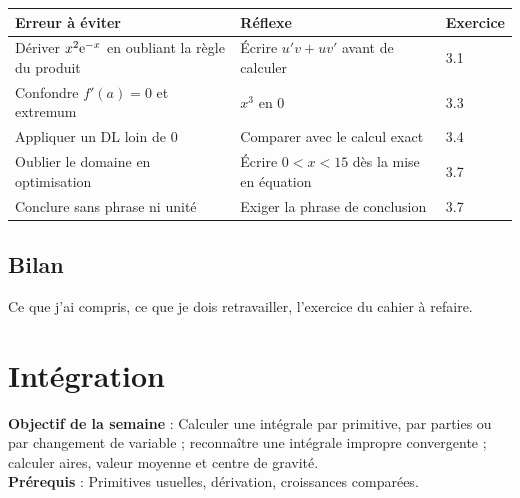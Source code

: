\documentclass[10.5pt,a4paper]{article}
\newif\ifprof
\newcommand{\synth}{\textsf{\textcolor{ardoise}{(synthèse)}}}
\newcommand{\profonly}[1]{\ifprof #1\fi}
\newcommand{\titrecourant}{Guide de séquence}
\begin{document}
\else
\begin{longtable}{@{}p{7.2cm}p{7.2cm}p{1.6cm}@{}}
\toprule \textbf{Erreur à éviter} & \textbf{Réflexe} & \textbf{Exercice}\\ \midrule\endhead
Dériver $x^2\mathrm{e}^{-x}$ en oubliant la règle du produit & Écrire $u'v+uv'$ avant de calculer & 3.1\\
Confondre $f'(a)=0$ et extremum & $x^3$ en $0$ & 3.3\\
Appliquer un DL loin de $0$ & Comparer avec le calcul exact & 3.4\\
Oublier le domaine en optimisation & Écrire $0<x<15$ dès la mise en équation & 3.7\\
Conclure sans phrase ni unité & Exiger la phrase de conclusion & 3.7\\
\bottomrule\end{longtable}
\fi
\profonly{\subsection{Différenciation et variante FLE/FLS}
Étayage : fiche en cinq étapes pour l'optimisation. Niveaux : 3.1 (socle), 3.4 (intermédiaire), 3.7 (approfondissement). Extension : 3.8 (discussion de racines selon $m$). FLE/FLS : lexique tangente/tangent line, point critique/critical point, minimum/minimum.
\subsection{Évaluation}
Contrôle du cahier \S3.6 (20 points). Barème et corrigé : voir le cahier. Les causes d'erreur ci-dessus sont des hypothèses didactiques, non des constats \synth.}
\subsection{Bilan}
\ifprof À renseigner après la semaine : notions mal acquises, temps réel, réajustements.\else Ce que j'ai compris, ce que je dois retravailler, l'exercice du cahier à refaire.\fi
\clearpage
\section{Intégration}
\renewcommand{\titrecourant}{Semaine 4}
\begin{objectif}\textbf{Objectif de la semaine} : Calculer une intégrale par primitive, par parties ou par changement de variable ; reconnaître une intégrale impropre convergente ; calculer aires, valeur moyenne et centre de gravité.\\\textbf{Prérequis} : Primitives usuelles, dérivation, croissances comparées.\end{objectif}
\end{document}
